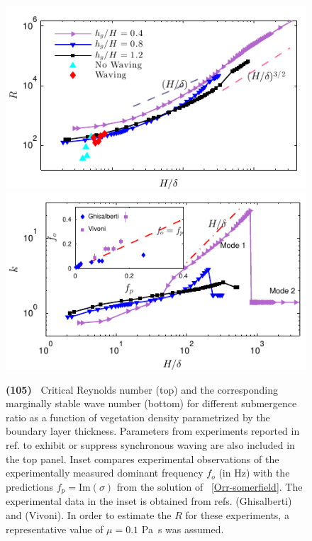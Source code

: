 \documentclass[aps,prl,reprint,twocolumn,superscriptaddress,sort&compress,10pt]{revtex4-1}  %
\newcommand{\Rey}{{R}}
\newcommand{\words}[1]{\textbf{(#1)~}}
\begin{document}
\begin{figure}
\begin{center}
\includegraphics[]{Critical_Re_vs_delta_noshear} \\
\vspace{-6mm} \hspace{-3mm}
\includegraphics[]{K_vs_shear_width_noshear}
\end{center}
\caption{
\words{105} Critical Reynolds number (top) and the corresponding marginally stable wave number (bottom) for different submergence ratio as a function of vegetation density parametrized by the boundary layer thickness. 
Parameters from experiments reported in ref. \cite{Ghisal02} to exhibit or suppress synchronous waving are also included in the top panel. 
Inset compares experimental observations of the experimentally measured dominant frequency $f_o$ (in Hz) with the predictions $f_p=\text{Im}(\sigma)$ from the solution of ~\eqref{Orr-somerfield}. 
The experimental data in the inset is obtained from refs. \cite{Ghisal02} (Ghisalberti) and \cite{Vivoni98} (Vivoni). 
In order to estimate the $\Rey$ for these experiments, a representative value of $\mu=0.1$ Pa~s was assumed.
}
\label{Re_vs_delta}
\end{figure}
\end{document}

